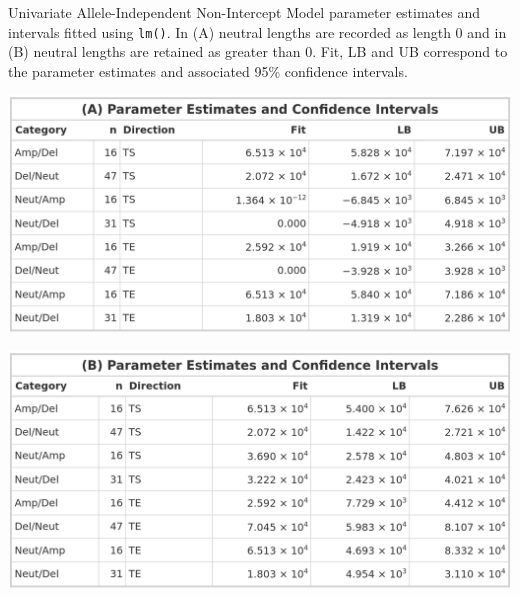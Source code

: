 \begin{table}[H]
\vspace{0.5cm}
    \caption[Univariate Allele-Independent Non-Intercept Model parameter estimates and intervals fitted using \texttt{lm()}.]{Univariate Allele-Independent Non-Intercept Model parameter estimates and intervals fitted using \texttt{lm()}. In (A) neutral lengths are recorded as length 0 and in (B) neutral lengths are retained as greater than 0. Fit, LB and UB correspond to the parameter estimates and associated 95\% confidence intervals. }
    \label{tbl:lm_uni_2_pred}
     \begin{subtable}[t]{.49\textwidth}
      \centering
      \includegraphics[width = 1\textwidth]{../tables/Chapter_5/Univariate_lm_6_AI_Pred.png}
    \end{subtable}%
    \hspace{0.5cm}
     \begin{subtable}[t]{.49\textwidth}
      \centering
         \includegraphics[width = 1\textwidth]{../tables/Chapter_5/Univariate_lm_6_Neut_AI_Pred.png}
    \end{subtable} 
\end{table}

